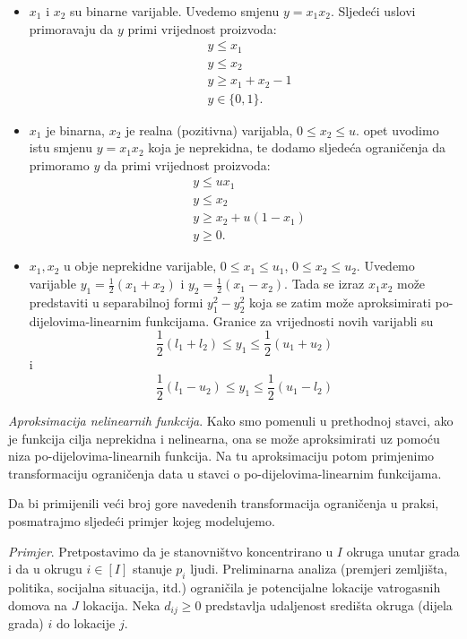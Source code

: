 \documentclass[a4paper, utf8, 11pt, colorlinks]{book}
\begin{document}
 \begin{itemize}
 	\item $x_1$ i $x_2$ su binarne varijable. Uvedemo smjenu $y=x_1 x_2$. Sljedeći uslovi primoravaju da $y$ primi vrijednost proizvoda:
 	  \begin{align*}
 		      &y \leq x_1 \\
 		      &y \leq x_2 \\
 		      & y \geq x_1 + x_2 - 1 \\
 		      & y \in \{0, 1\}.
 	  \end{align*}
   \item $x_1$ je binarna, $x_2$ je realna (pozitivna) varijabla, $0 \leq x_2 \leq u$. opet uvodimo istu smjenu $y= x_1 x_2$ koja je neprekidna, te dodamo sljedeća ograničenja da primoramo $y$ da primi vrijednost proizvoda:
    \begin{align*}
    	 &y \leq u x_1 \\
    	 &y \leq x_2 \\
    	 & y \geq x_2 + u(1-x_1) \\
    	 & y \geq 0.
    \end{align*}
  \item $x_1, x_2$ u obje neprekidne varijable, $0 \leq x_1 \leq u_1$, $0 \leq x_2 \leq u_2$. Uvedemo varijable $y_1 = \frac{1}{2}( x_1 + x_2) $ i  $y_2 =\frac{1}{2}(x_1 - x_2)$. Tada se izraz $x_1x_2$ može predstaviti u separabilnoj formi $y_1^2 - y_2^2$ koja se zatim može aproksimirati po-dijelovima-linearnim funkcijama. Granice za vrijednosti novih varijabli su 
  $$ \frac{1}{2}(l_1 + l_2) \leq y_1 \leq \frac{1}{2}(u_1 + u_2)$$ i 
  $$ \frac{1}{2}(l_1 - u_2) \leq y_1 \leq \frac{1}{2}(u_1 - l_2) $$
  
 \end{itemize} 

\emph{Aproksimacija nelinearnih funkcija}. Kako smo pomenuli u prethodnoj stavci, ako je funkcija cilja neprekidna i nelinearna, ona se može aproksimirati uz pomoću niza po-dijelovima-linearnih funkcija. Na tu aproksimaciju potom primjenimo transformaciju ograničenja  data u stavci o po-dijelovima-linearnim funkcijama. 

Da bi primijenili veći broj gore navedenih transformacija ograničenja u praksi, posmatrajmo sljedeći primjer kojeg modelujemo. 


\emph{Primjer}. Pretpostavimo da je stanovništvo koncentrirano u $I$ okruga  unutar grada i da u okrugu $i\in [I]$ stanuje $p_i$ ljudi. Preliminarna analiza (premjeri zemljišta, politika, socijalna situacija, itd.) ograničila je potencijalne lokacije vatrogasnih domova na $J$ lokacija. Neka $d_{ij} \geq 0$ predstavlja udaljenost   središta okruga (dijela grada) $i$  do lokacije $j$. 
\end{document}
